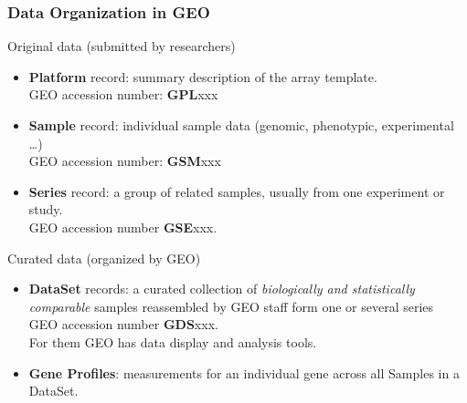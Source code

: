 \documentclass{beamer}
\begin{document}
\begin{frame}[allowframebreaks]
  \frametitle{Data Organization in GEO}

  Original data (submitted by researchers)

  \begin{itemize}
  \item \textbf{Platform} record: summary description of the array template. \\
    GEO accession number: \textbf{GPL}xxx
  \item \textbf{Sample} record: individual sample data (genomic, phenotypic, experimental \dots) \\
    GEO accession number: \textbf{GSM}xxx
  \item \textbf{Series} record: a group of related samples, usually from one experiment or study. \\
    GEO accession number \textbf{GSE}xxx.
  \end{itemize}
  
  \framebreak
  
  Curated data (organized by GEO)
  
  \begin{itemize}
  \item \textbf{DataSet} records: a curated collection of \textit{biologically and statistically comparable} samples
    reassembled by GEO staff form one or several series \\
    GEO accession number \textbf{GDS}xxx.  \\
    For them GEO has data display and analysis tools. 
  \item \textbf{Gene Profiles}: measurements for an individual gene across all Samples in a DataSet.
  \end{itemize}
      
\end{frame}

\end{document}

